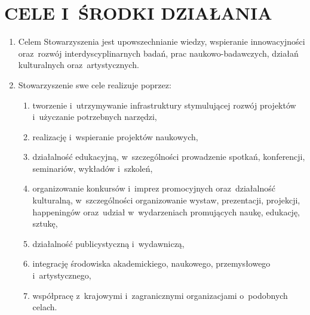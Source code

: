 \documentclass{article}
\begin{document}
\section{CELE I~ŚRODKI DZIAŁANIA}
  \begin{enumerate}
    \item Celem Stowarzyszenia jest upowszechnianie wiedzy, wspieranie innowacyjności oraz~rozwój interdyscyplinarnych badań, prac naukowo-badawczych, działań kulturalnych oraz~artystycznych.
    \item Stowarzyszenie swe cele realizuje poprzez:
      \begin{enumerate}
        \item tworzenie i~utrzymywanie infrastruktury stymulującej rozwój projektów i~użyczanie potrzebnych narzędzi,
        \item realizację i~wspieranie projektów naukowych,
        \item działalność edukacyjną, w~szczególności prowadzenie spotkań, konferencji, seminariów, wykładów i~szkoleń,
        \item organizowanie konkursów i~imprez promocyjnych oraz~działalność kulturalną, w~szczególności organizowanie wystaw, prezentacji, projekcji, happeningów oraz~udział w~wydarzeniach promujących naukę, edukację, sztukę,
        \item działalność publicystyczną i~wydawniczą,
        \item integrację środowiska akademickiego, naukowego, przemysłowego i~artystycznego,
        \item współpracę z~krajowymi i~zagranicznymi organizacjami o~podobnych celach.
      \end{enumerate}
  \end{enumerate}
\end{document}
